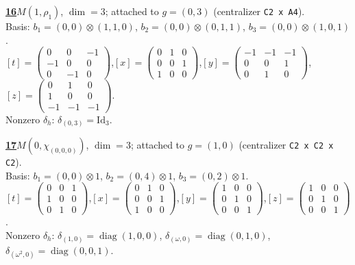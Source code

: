 \begin{samepage}\noindent\textbf{\underline{16}}\quad $M(1,\rho_{1})$, $\dim=3$; attached to $g=(0,3)$ (centralizer \texttt{C2 x A4}).\\
Basis: $b_{1}=(0,0)\otimes (1,1,0)$, $b_{2}=(0,0)\otimes (0,1,1)$, $b_{3}=(0,0)\otimes (1,0,1)$.\\
$[t]=\left(\begin{smallmatrix} 0 & 0 & -1 \\ -1 & 0 & 0 \\ 0 & -1 & 0 \end{smallmatrix}\right)$,\quad $[x]=\left(\begin{smallmatrix} 0 & 1 & 0 \\ 0 & 0 & 1 \\ 1 & 0 & 0 \end{smallmatrix}\right)$,\quad $[y]=\left(\begin{smallmatrix} -1 & -1 & -1 \\ 0 & 0 & 1 \\ 0 & 1 & 0 \end{smallmatrix}\right)$,\quad $[z]=\left(\begin{smallmatrix} 0 & 1 & 0 \\ 1 & 0 & 0 \\ -1 & -1 & -1 \end{smallmatrix}\right)$.\\
Nonzero $\delta_h$: $\delta_{(0,3)}=\mathrm{Id}_{3}$.\end{samepage}
\medskip

\begin{samepage}\noindent\textbf{\underline{17}}\quad $M(0,\chi_{(0,0,0)})$, $\dim=3$; attached to $g=(1,0)$ (centralizer \texttt{C2 x C2 x C2}).\\
Basis: $b_{1}=(0,0)\otimes 1$, $b_{2}=(0,4)\otimes 1$, $b_{3}=(0,2)\otimes 1$.\\
$[t]=\left(\begin{smallmatrix} 0 & 0 & 1 \\ 1 & 0 & 0 \\ 0 & 1 & 0 \end{smallmatrix}\right)$,\quad $[x]=\left(\begin{smallmatrix} 0 & 1 & 0 \\ 0 & 0 & 1 \\ 1 & 0 & 0 \end{smallmatrix}\right)$,\quad $[y]=\left(\begin{smallmatrix} 1 & 0 & 0 \\ 0 & 1 & 0 \\ 0 & 0 & 1 \end{smallmatrix}\right)$,\quad $[z]=\left(\begin{smallmatrix} 1 & 0 & 0 \\ 0 & 1 & 0 \\ 0 & 0 & 1 \end{smallmatrix}\right)$.\\
Nonzero $\delta_h$: $\delta_{(1,0)}=\operatorname{diag}(1,0,0)$, $\delta_{(\omega,0)}=\operatorname{diag}(0,1,0)$, $\delta_{(\omega^2,0)}=\operatorname{diag}(0,0,1)$.\end{samepage}
\medskip

